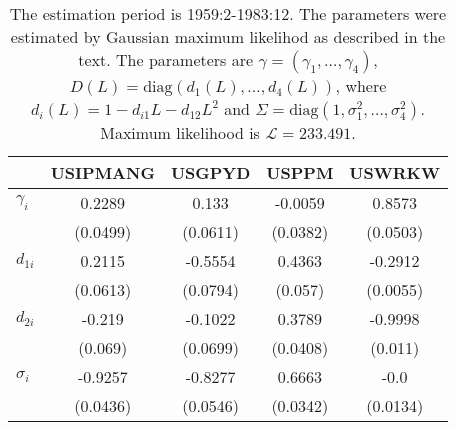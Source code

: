 \begin{table}[h!]
\centering\captionsetup{width=0.8\textwidth, font=small}
\caption{The estimation period is 1959:2-1983:12. The parameters were estimated by Gaussian maximum likelihod as described in the text. The parameters are $\gamma = (\gamma_1,\ldots, \gamma_4)$, $D(L)=\text{diag}\left(d_1(L),\ldots, d_4(L)\right)$, where $d_i(L) = 1-d_{i1}L - d_{12}L^2$ and $\Sigma = \text{diag} \left(1,\sigma_1^2,\ldots,\sigma_4^2\right)$. Maximum likelihood is $\mathcal{L}=233.491$.}\label{tab:newdata-ml-params}
\begin{tabular}{l|cccc}
&USIPMANG&USGPYD&USPPM&USWRKW\\\hline\hline
$\gamma_i$&0.2289&0.133&-0.0059&0.8573\\
&(0.0499)&(0.0611)&(0.0382)&(0.0503)\\
$d_{1i}$&0.2115&-0.5554&0.4363&-0.2912\\
&(0.0613)&(0.0794)&(0.057)&(0.0055)\\
$d_{2i}$&-0.219&-0.1022&0.3789&-0.9998\\
&(0.069)&(0.0699)&(0.0408)&(0.011)\\
$\sigma_i$&-0.9257&-0.8277&0.6663&-0.0\\&(0.0436)&(0.0546)&(0.0342)&(0.0134)\\\hline\hline
\end{tabular}
\end{table}